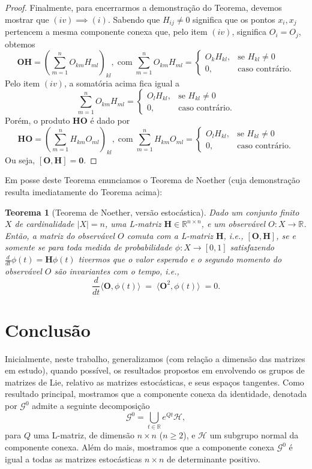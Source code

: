 \documentclass[twoside,openright,titlepage,numbers=noenddot,headinclude,  lineheaders footinclude=true,cleardoublepage=empty,
                                BCOR=5mm,paper=a4,fontsize=12pt ]{scrbook}
\newtheorem{teo}{Teorema}[chapter]
\theoremstyle{definition}
\begin{document}
\begin{proof}
Finalmente, para encerrarmos a demonstração do Teorema, devemos mostrar
que $(iv) \implies (i)$.
Sabendo que $H_{ij} \neq 0$ significa que os pontos $x_i, x_j$
 pertencem a mesma componente conexa que, pelo item $(iv)$, significa
$O_i = O_j$, obtemos
\[
\bm{OH} = \left( \sum_{m=1}^n O_{km} H_{ml} \right)_{kl},
\; \text{com} \;
\sum_{m=1}^n O_{km} H_{ml} =
\begin{cases}
O_k H_{kl}, & \text{se } H_{kl} \neq 0\\
0, & \text{caso contrário.}
\end{cases}
\]
Pelo  item $(iv)$, a somatória acima fica igual a
\[
\sum_{m=1}^n O_{km} H_{ml} =
\begin{cases}
O_l H_{kl}, & \text{se } H_{kl} \neq 0\\
0, & \text{caso contrário.}
\end{cases}
\]
Porém, o produto $\bm{HO}$ é dado por
\[
\bm{HO} = \left( \sum_{m=1}^n H_{km}O_{ml} \right)_{kl},
\; \text{com} \;
\sum_{m=1}^n H_{km}O_{ml} =
\begin{cases}
O_l H_{kl}, & \text{se } H_{kl} \neq 0\\
0, & \text{caso contrário.}
\end{cases}
\]
Ou seja, $[\bm{O}, \bm{H}] = \bm{0}$.
\end{proof}

Em posse deste Teorema enunciamos o Teorema de Noether (cuja
demonstração resulta imediatamente do Teorema acima):
\begin{teo}[Teorema de Noether, versão estocástica]
Dado um conjunto finito $X$ de cardinalidade
$|X| = n$, uma L-matriz $\bm{H} \in \mathbb{R}^{n \times n}$,
e um observável $O: X \rightarrow \mathbb{R}$. 
Então, a matriz do observável $O$ comuta com a L-matriz $\bm{H}$,
i.e., $[\bm{O}, \bm{H}]$, se e somente se para toda medida de
probabilidade $\phi: X \rightarrow [0,1]$ satisfazendo
$\frac{d}{dt}\phi(t) = \bm{H}\phi(t)$ tivermos que o valor
esperado e o segundo momento do observável $O$ são invariantes
com  o tempo, i.e.,
\[\frac{d}{dt} \langle \bm{O}, \phi(t) \rangle \;=\;
\langle \bm{O}^2, \phi(t) \rangle \; = 0.\]
\end{teo}


\chapter{Conclus\~ao}

Inicialmente, neste trabalho, generalizamos (com relação a dimensão das matrizes
em estudo), quando possível, os resultados propostos
em \cite{paper1} envolvendo os grupos de matrizes de Lie, relativo as matrizes estocásticas, e seus espaços tangentes.
Como resultado principal, mostramos que a componente conexa da identidade, denotada por $\mathcal{G}^0$
admite a seguinte decomposição
\[ \mathcal{G}^0 = \bigcup_{t \in \mathbb{R}}  e^{Qt} \mathcal{H}, \]
para $Q$ uma L-matriz, de dimensão $n \times n$ ($n \geq 2$), e $\mathcal{H}$ um subgrupo normal da
componente conexa. Além do mais, mostramos que a componente conexa $\mathcal{G}^0$ é igual a
todas as matrizes estocásticas $n \times n$ de determinante positivo.
\end{document}
